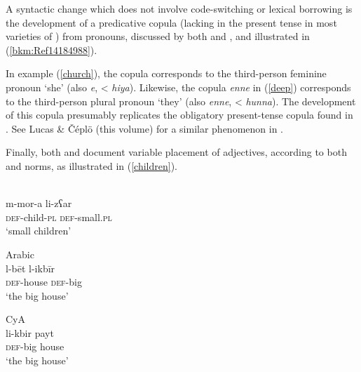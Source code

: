 \documentclass[output=paper]{langsci/langscibook}
\begin{document}
A syntactic change which does not involve {code-switching} or lexical borrowing is the development of a predicative {copula} (lacking in the present {tense} in most varieties of ) from  pronouns, discussed by both \citet{Roth2004} and \citet{Borg1985}, and illustrated in (\ref{bkm:Ref14184988}).




In example (\ref{church}), the {copula} corresponds to the third-person feminine pronoun ‘she’ (also \textit{e}, < \textit{hiya}). Likewise, the {copula} \textit{enne} in (\ref{deep}) corresponds to the third-person plural pronoun ‘they’ (also \textit{enne}, < \textit{hunna}). The development of this {copula} presumably replicates the obligatory present-{tense} {copula} found in . See Lucas \& Čéplö (this volume) for a similar phenomenon in .

Finally, both \citet{Roth2004} and \citet{Newton1964} document variable placement of adjectives, according to both  and  norms, as illustrated in (\ref{children}).


\ea\label{children}
 {\citealt[72]{Roth2004}}\\
\gll m-mor-a li-zʕar\\
     \textsc{def}-child-\textsc{pl} \textsc{def}-small.\textsc{pl}  \\
\glt ‘small children’

\ex
{} Arabic{} {\citealt[48]{Newton1964}}\\
\gll l-bēt l-ikbīr\\
     \textsc{def}-house \textsc{def}-big  \\
\glt ‘the big house’

\ex
{CyA}{} {\citealt[47]{Newton1964}}\\
\gll li-kbir payt\\
     \textsc{def}-big house  \\
\glt ‘the big house’
\end{document}
